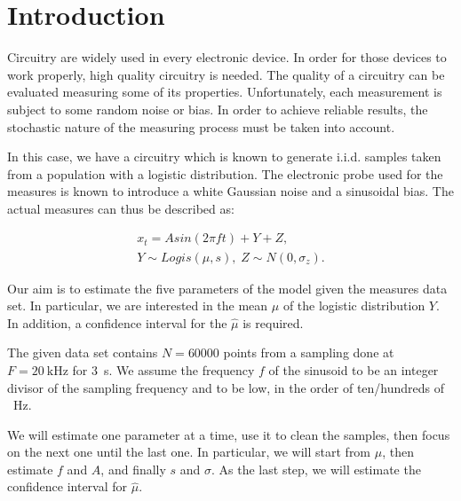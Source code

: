 \section{Introduction}
\label{sec:introduction}
Circuitry are widely used in every electronic device.
In order for those devices to work properly, high quality circuitry is needed.
The quality of a circuitry can be evaluated measuring some of its properties.
Unfortunately, each measurement is subject to some random noise or bias.
In order to achieve reliable results, the stochastic nature of the measuring process must be taken into account.

In this case, we have a circuitry which is known to generate \ac{i.i.d.} samples taken from a population with a logistic distribution.
The electronic probe used for the measures is known to introduce a white Gaussian noise and a sinusoidal bias.
The actual measures can thus be described as:

\begin{equation}
    \begin{gathered}
        x_{t} = A sin(2 \pi f t) + Y + Z, \\
        Y \sim Logis(\mu, s), \; Z \sim N(0, \sigma_{z}).
    \end{gathered}
    \label{eq:original-sample}
\end{equation}

Our aim is to estimate the five parameters of the model given the measures data set.
In particular, we are interested in the mean $\mu$ of the logistic distribution $Y$.
In addition, a confidence interval for the $\hat{\mu}$ is required.

The given data set contains $N = \num{60000}$ points from a sampling done at $ F = \SI{20}{\kilo\hertz}$ for \SI{3}{\second}.
We assume the frequency $f$ of the sinusoid to be an integer divisor of the sampling frequency and to be low, in the order of ten/hundreds of \SI{}{\hertz}.

We will estimate one parameter at a time, use it to clean the samples, then focus on the next one until the last one.
In particular, we will start from $\mu$, then estimate $f$ and $A$, and finally $s$ and $\sigma$.
As the last step, we will estimate the confidence interval for $\hat{\mu}$.
